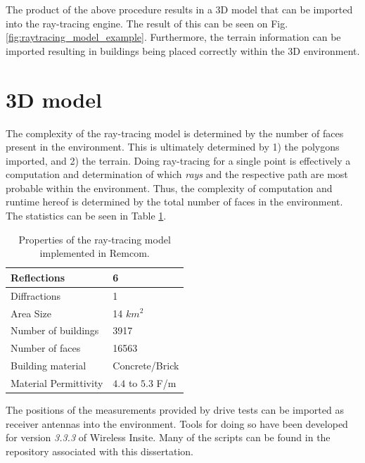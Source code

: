 The product of the above procedure results in a 3D model that can be imported into the ray-tracing engine. The result of this can be seen on Fig. \ref{fig:raytracing_model_example}. Furthermore, the terrain information can be imported resulting in buildings being placed correctly within the 3D environment.


\section{3D model}

The complexity of the ray-tracing model is determined by the number of faces present in the environment. This is ultimately determined by 1) the polygons imported, and 2) the terrain. Doing ray-tracing for a single point is effectively a computation and determination of which  \emph{rays} and the respective path are most probable within the environment. Thus, the complexity of computation and runtime hereof is determined by the total number of faces in the environment. The statistics can be seen in Table \ref{tab:ray_prop}.

\begin{table}[]
\begin{center}
\begin{tabular}{l|l}
Reflections         & 6  \\ \hline
Diffractions        & 1  \\ \hline
Area Size           & 14 $km^2$ \\ \hline
Number of buildings & 3917 \\ \hline
Number of faces     & 16563 \\ \hline
Building material   & Concrete/Brick  \\ \hline
Material Permittivity & $4.4$ to $5.3$ F/m \\ \hline
\end{tabular}
\end{center}
\caption{Properties of the ray-tracing model implemented in Remcom.}\label{tab:ray_prop}
\vspace{-1em}
\end{table}

The positions of the measurements provided by drive tests can be imported as receiver antennas into the environment. Tools for doing so have been developed for version \emph{3.3.3} of Wireless Insite. Many of the scripts can be found in the repository associated with this dissertation.

